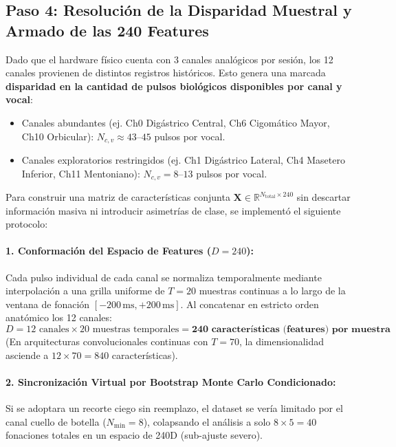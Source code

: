 \documentclass[11pt,a4paper,openany]{book}
\theoremstyle{definition}
\begin{document}
\subsection{Paso 4: Resolución de la Disparidad Muestral y Armado de las 240 Features}
Dado que el hardware físico cuenta con 3 canales analógicos por sesión, los 12 canales provienen de distintos registros históricos. Esto genera una marcada \textbf{disparidad en la cantidad de pulsos biológicos disponibles por canal y vocal}:
\begin{itemize}
    \item Canales abundantes (ej. Ch0 Digástrico Central, Ch6 Cigomático Mayor, Ch10 Orbicular): $N_{c,v} \approx 43$--$45$ pulsos por vocal.
    \item Canales exploratorios restringidos (ej. Ch1 Digástrico Lateral, Ch4 Masetero Inferior, Ch11 Mentoniano): $N_{c,v} = 8$--$13$ pulsos por vocal.
\end{itemize}

Para construir una matriz de características conjunta $\mathbf{X} \in \mathbb{R}^{N_{\text{total}} \times 240}$ sin descartar información masiva ni introducir asimetrías de clase, se implementó el siguiente protocolo:

\paragraph{1. Conformación del Espacio de Features ($D = 240$):}
Cada pulso individual de cada canal se normaliza temporalmente mediante interpolación a una grilla uniforme de $T = 20$ muestras continuas a lo largo de la ventana de fonación $[-200\,\text{ms}, +200\,\text{ms}]$. Al concatenar en estricto orden anatómico los 12 canales:
\begin{equation}
D = 12 \text{ canales} \times 20 \text{ muestras temporales} = \mathbf{240 \text{ características (features) por muestra}}
\end{equation}
(En arquitecturas convolucionales continuas con $T = 70$, la dimensionalidad asciende a $12 \times 70 = 840$ características).

\paragraph{2. Sincronización Virtual por Bootstrap Monte Carlo Condicionado:}
Si se adoptara un recorte ciego sin reemplazo, el dataset se vería limitado por el canal cuello de botella ($N_{\min} = 8$), colapsando el análisis a solo $8 \times 5 = 40$ fonaciones totales en un espacio de 240D (sub-ajuste severo).
\end{document}

